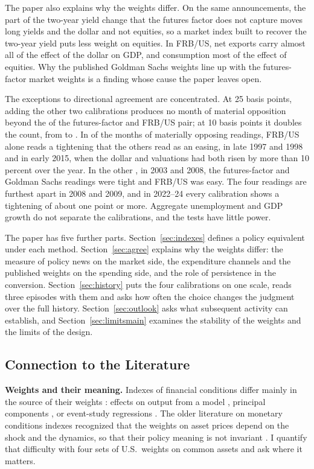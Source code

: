 \documentclass[11pt]{article}
\begin{document}
The paper also explains why the weights differ. On the same announcements, the part of the two-year yield change that the futures factor does not capture moves long yields and the dollar and not equities, so a market index built to recover the two-year yield puts less weight on equities. In FRB/US, net exports carry almost all of the effect of the dollar on GDP, and consumption most of the effect of equities. Why the published Goldman Sachs weights line up with the futures-factor market weights is a finding whose cause the paper leaves open.

The exceptions to directional agreement are concentrated. At 25 basis points, adding the other two calibrations produces no month of material opposition beyond the  of the futures-factor and FRB/US pair; at 10 basis points it doubles the count, from  to . In  of the  months of materially opposing readings, FRB/US alone reads a tightening that the others read as an easing, in late 1997 and 1998 and in early 2015, when the dollar and valuations had both risen by more than 10 percent over the year. In the other , in 2003 and 2008, the futures-factor and Goldman Sachs readings were tight and FRB/US was easy. The four readings are furthest apart in 2008 and 2009, and in 2022--24 every calibration shows a tightening of about one point or more. Aggregate unemployment and GDP growth do not separate the calibrations, and the tests have little power.

The paper has five further parts. Section~\ref{sec:indexes} defines a policy equivalent under each method. Section~\ref{sec:agree} explains why the weights differ: the measure of policy news on the market side, the expenditure channels and the published weights on the spending side, and the role of persistence in the conversion. Section~\ref{sec:history} puts the four calibrations on one scale, reads three episodes with them and asks how often the choice changes the judgment over the full history. Section~\ref{sec:outlook} asks what subsequent activity can establish, and Section~\ref{sec:limitsmain} examines the stability of the weights and the limits of the design.

\subsection{Connection to the Literature}
\textbf{Weights and their meaning.} Indexes of financial conditions differ mainly in the source of their weights \citep{hatzius2010}: effects on output from a model \citep{dudley2000,hatzius2018,ajello2023}, principal components \citep{brave2011}, or event-study regressions \citep{kuttner2001,gurkaynak2005,bernanke2005,nakamura2018,bauer2023}. The older literature on monetary conditions indexes recognized that the weights on asset prices depend on the shock and the dynamics, so that their policy meaning is not invariant \citep{eika1996}. I quantify that difficulty with four sets of U.S.\ weights on common assets and ask where it matters.
\end{document}

